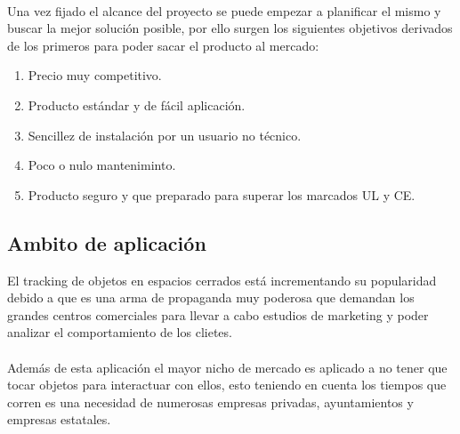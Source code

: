 \documentclass[a4paper ,12pt, onecolumn]{article}
\begin{document}
        \paragraph{}
        Una vez fijado el alcance del proyecto se puede empezar a planificar el mismo y buscar la mejor solución 
        posible, por ello surgen los siguientes objetivos derivados de los primeros para poder sacar el producto 
        al mercado:
        \begin{enumerate}
            \item Precio muy competitivo.
            \item Producto estándar y de fácil aplicación.
            \item Sencillez de instalación por un usuario no técnico.
            \item Poco o nulo manteniminto.
            \item Producto seguro y que preparado para superar los marcados UL y CE.
        \end{enumerate}
    \subsection{Ambito de aplicación}
        El tracking de objetos en espacios cerrados está incrementando su popularidad debido a que es una 
        arma de propaganda muy poderosa que demandan los grandes centros comerciales para llevar a cabo estudios de marketing
        y poder analizar el comportamiento de los clietes.
        \paragraph{}
        Además de esta aplicación el mayor nicho de mercado es aplicado a no tener que tocar objetos para interactuar con ellos, 
        esto teniendo en cuenta los tiempos que corren es una necesidad de numerosas empresas privadas, ayuntamientos 
        y empresas estatales.
\end{document}
